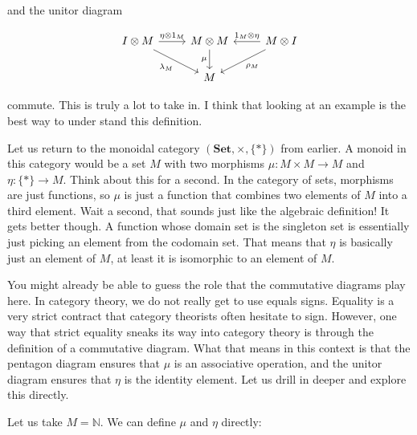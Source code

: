 \documentclass{article}
\begin{document}
and the unitor diagram

\begin{equation*}
  \begin{tikzcd}
    I \otimes M \arrow[r, "\eta \otimes 1_M"] \arrow[rd, "\lambda_M"'] & M \otimes M \arrow[d, "\mu"'] & M \otimes I \arrow[l, "1_M \otimes \eta"'] \arrow[ld, "\rho_M"] \\
                                                                       & M                             &
  \end{tikzcd}
\end{equation*}

commute. This is truly a lot to take in. I think that looking at an example is
the best way to under stand this definition.

Let us return to the monoidal category $(\textbf{Set}, \times, \{*\})$ from
earlier. A monoid in this category would be a set $M$ with two morphisms $\mu :
M \times M \to M$ and $\eta : \{*\} \to M$. Think about this for a second. In
the category of sets, morphisms are just functions, so $\mu$ is just a function
that combines two elements of $M$ into a third element. Wait a second, that
sounds just like the algebraic definition! It gets better though. A function
whose domain set is the singleton set is essentially just picking an element
from the codomain set. That means that $\eta$ is basically just an element of
$M$, at least it is isomorphic to an element of $M$.

You might already be able to guess the role that the commutative diagrams play
here. In category theory, we do not really get to use equals signs. Equality is
a very strict contract that category theorists often hesitate to sign. However,
one way that strict equality sneaks its way into category theory is through the
definition of a commutative diagram. What that means in this context is that
the pentagon diagram ensures that $\mu$ is an associative operation, and the
unitor diagram ensures that $\eta$ is the identity element. Let us drill in
deeper and explore this directly.

Let us take $M = \mathbb{N}$. We can define $\mu$ and $\eta$ directly:
\end{document}
